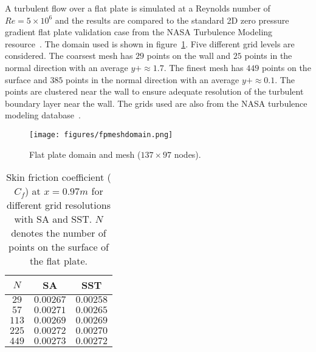 A turbulent flow over a flat plate is simulated at a Reynolds number of  $Re=5\times10^6$ and the results are compared to the standard 2D zero pressure gradient flat plate validation case from the NASA Turbulence Modeling resource~\cite{NASATMR}. The domain used is shown in figure~\ref{fig:turbfpdomain}. Five different grid levels are considered.  The coarsest mesh has $29$ points on the wall and $25$ points in the normal direction with an average $y+ \approx 1.7$. The finest mesh has $449$ points on the surface and $385$ points in the normal direction with an average $y+ \approx 0.1$. The points are clustered near the wall to ensure adequate resolution of the turbulent boundary layer near the wall. The grids used are also from the NASA turbulence modeling database~\cite{NASATMR}.
\begin{figure}[h!]
\centering
 \captionsetup{justification=centering}
\texttt{[image: figures/fpmeshdomain.png]}
\caption{Flat plate domain and mesh ($137\times97$ nodes).}
\label{fig:turbfpdomain}
\end{figure}
\begin{table}[h!]
\centering
\captionsetup{justification=centering}
\begin{tabular}{ |c|c|c| } 
\hline
$N$ & SA & SST \\
\hline
  $29$  & $0.00267$ & $0.00258$\\ 
 \hline
  $57$  & $0.00271$ & $0.00265$\\ 
 \hline
 $113$ & $0.00269$ & $0.00269$\\ 
 \hline
 $225$ & $0.00272$ & $0.00270$\\ 
 \hline
 $449$ & $0.00273$ & $0.00272$\\ 
 \hline
\end{tabular}
\caption{Skin friction coefficient ($C_f$) at $x=0.97 m$ for different grid resolutions with SA and SST. $N$ denotes the number of points on the surface of the flat plate.}
\label{tab:fpgrpb}
\end{table}

